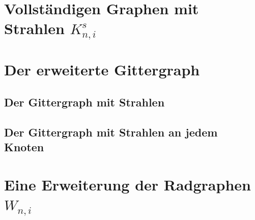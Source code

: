 \section{Vollständigen Graphen mit Strahlen $K^s_{n,i}$}

\section{Der erweiterte Gittergraph}
\subsection{Der Gittergraph mit Strahlen}
\subsection{Der Gittergraph mit Strahlen an jedem Knoten}
\section{Eine Erweiterung der Radgraphen $W_{n,i}$}
\vspace{-2mm}
